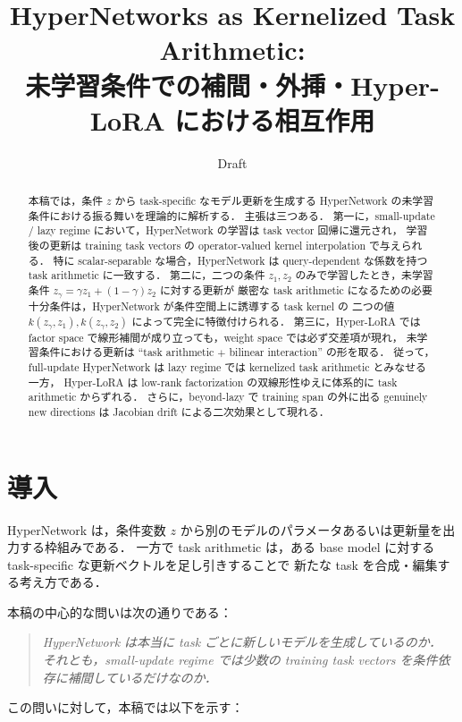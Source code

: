 \documentclass[a4paper,11pt]{bxjsarticle}
\title{HyperNetworks as Kernelized Task Arithmetic:\\
未学習条件での補間・外挿・Hyper-LoRA における相互作用}
\author{Draft}
\date{}
\theoremstyle{definition}
\begin{document}
\maketitle

\begin{abstract}
本稿では，条件 $z$ から task-specific なモデル更新を生成する HyperNetwork の未学習条件における振る舞いを理論的に解析する．
主張は三つある．
第一に，small-update / lazy regime において，HyperNetwork の学習は task vector 回帰に還元され，
学習後の更新は training task vectors の operator-valued kernel interpolation で与えられる．
特に scalar-separable な場合，HyperNetwork は query-dependent な係数を持つ task arithmetic に一致する．
第二に，二つの条件 $z_1,z_2$ のみで学習したとき，未学習条件 $z_\gamma=\gamma z_1+(1-\gamma)z_2$ に対する更新が
厳密な task arithmetic になるための必要十分条件は，HyperNetwork が条件空間上に誘導する task kernel の
二つの値 $k(z_\gamma,z_1),k(z_\gamma,z_2)$ によって完全に特徴付けられる．
第三に，Hyper-LoRA では factor space で線形補間が成り立っても，weight space では必ず交差項が現れ，
未学習条件における更新は ``task arithmetic $+$ bilinear interaction'' の形を取る．
従って，full-update HyperNetwork は lazy regime では kernelized task arithmetic とみなせる一方，
Hyper-LoRA は low-rank factorization の双線形性ゆえに体系的に task arithmetic からずれる．
さらに，beyond-lazy で training span の外に出る genuinely new directions は Jacobian drift による二次効果として現れる．
\end{abstract}

\section{導入}

HyperNetwork は，条件変数 $z$ から別のモデルのパラメータあるいは更新量を出力する枠組みである．
一方で task arithmetic は，ある base model に対する task-specific な更新ベクトルを足し引きすることで
新たな task を合成・編集する考え方である．

本稿の中心的な問いは次の通りである：

\begin{quote}
\emph{HyperNetwork は本当に task ごとに新しいモデルを生成しているのか．
それとも，small-update regime では少数の training task vectors を条件依存に補間しているだけなのか．}
\end{quote}

この問いに対して，本稿では以下を示す：
\end{document}
